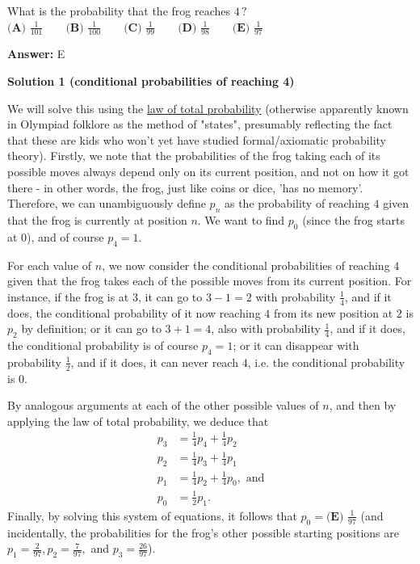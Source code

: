\begin{enumerate}
 What is the probability that the frog reaches ${4\,?}$
$\textbf{(A) } \frac{1}{101} \qquad\textbf{(B) } \frac{1}{100} \qquad\textbf{(C) } \frac{1}{99} \qquad\textbf{(D) } \frac{1}{98} \qquad\textbf{(E) } \frac{1}{97}$

 \textbf{Answer: }E



\textbf{Solution 1 (conditional probabilities of reaching 4)}

We will solve this using the \href{https://en.wikipedia.org/wiki/Law\_of\_total\_probability}{law of total probability} (otherwise apparently known in Olympiad folklore as the method of "states", presumably reflecting the fact that these are kids who won't yet have studied formal/axiomatic probability theory). Firstly, we note that the probabilities of the frog taking each of its possible moves always depend only on its current position, and not on how it got there - in other words, the frog, just like coins or dice, 'has no memory'. Therefore, we can unambiguously define $p_n$ as the probability of reaching $4$ given that the frog is currently at position $n$. We want to find $p_0$ (since the frog starts at $0$), and of course $p_4 = 1$.

 
For each value of $n$, we now consider the conditional probabilities of reaching $4$ given that the frog takes each of the possible moves from its current position. For instance, if the frog is at $3$, it can go to $3-1 = 2$ with probability $\frac{1}{4}$, and if it does, the conditional probability of it now reaching $4$ from its new position at $2$ is $p_2$ by definition; or it can go to $3+1 = 4$, also with probability $\frac{1}{4}$, and if it does, the conditional probability is of course $p_4 = 1$; or it can disappear with probability $\frac{1}{2}$, and if it does, it can never reach $4$, i.e. the conditional probability is $0$.

 
By analogous arguments at each of the other possible values of $n$, and then by applying the law of total probability, we deduce that
 \begin{align*}p_3 &= \frac{1}{4}p_4 + \frac{1}{4}p_2 \\ p_2 &= \frac{1}{4}p_3 + \frac{1}{4}p_1 \\ p_1 &= \frac{1}{4}p_2 + \frac{1}{4}p_0, \text{ and} \\ p_0 &= \frac{1}{2}p_1.\end{align*}
Finally, by solving this system of equations, it follows that $p_0 = \boxed{\textbf{(E) } \frac{1}{97}}$ (and incidentally, the probabilities for the frog's other possible starting positions are $p_1 = \frac{2}{97}, p_2 = \frac{7}{97},$ and $p_3 = \frac{26}{97}$).


\end{enumerate}
